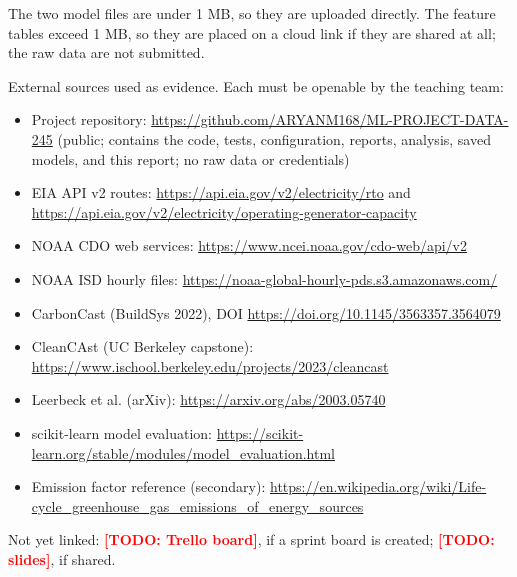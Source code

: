 \documentclass[10pt,journal,compsoc]{IEEEtran}
\newcommand{\todo}[1]{\textcolor{red}{\textbf{[TODO: #1]}}}
\begin{document}
The two model files are under 1 MB, so they are uploaded directly. The feature tables exceed 1 MB, so they are placed on a cloud link if they are shared at all; the raw data are not submitted.

External sources used as evidence. Each must be openable by the teaching team:
\begin{itemize}
\item Project repository: \url{https://github.com/ARYANM168/ML-PROJECT-DATA-245} (public; contains the code, tests, configuration, reports, analysis, saved models, and this report; no raw data or credentials)
\item EIA API v2 routes: \url{https://api.eia.gov/v2/electricity/rto} and \url{https://api.eia.gov/v2/electricity/operating-generator-capacity}
\item NOAA CDO web services: \url{https://www.ncei.noaa.gov/cdo-web/api/v2}
\item NOAA ISD hourly files: \url{https://noaa-global-hourly-pds.s3.amazonaws.com/}
\item CarbonCast (BuildSys 2022), DOI \url{https://doi.org/10.1145/3563357.3564079}
\item CleanCAst (UC Berkeley capstone): \url{https://www.ischool.berkeley.edu/projects/2023/cleancast}
\item Leerbeck et al. (arXiv): \url{https://arxiv.org/abs/2003.05740}
\item scikit-learn model evaluation: \url{https://scikit-learn.org/stable/modules/model_evaluation.html}
\item Emission factor reference (secondary): \url{https://en.wikipedia.org/wiki/Life-cycle_greenhouse_gas_emissions_of_energy_sources}
\end{itemize}

Not yet linked: \todo{Trello board}, if a sprint board is created; \todo{slides}, if shared.
\end{document}
